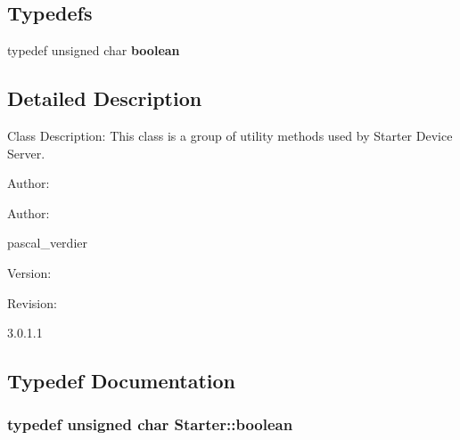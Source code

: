 \subsection*{Typedefs}
\begin{CompactItemize}
\item 
typedef unsigned char {\bf boolean}
\end{CompactItemize}


\subsection{Detailed Description}
Class Description: This class is a group of utility methods used by Starter Device Server.

\begin{Desc}
\item[Author: ]\par
\end{Desc}
\begin{Desc}
\item[Author: ]\par
 pascal\_\-verdier \end{Desc}
 \begin{Desc}
\item[Version: ]\par
\end{Desc}
\begin{Desc}
\item[Revision: ]\par
 3.0.1.1 \end{Desc}
 



\subsection{Typedef Documentation}
\subsubsection{\setlength{\rightskip}{0pt plus 5cm}typedef unsigned char Starter::boolean}\label{namespaceStarter_a0}


